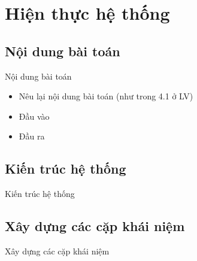 \section{Hiện thực hệ thống}
\subsection{Nội dung bài toán}
\begin{frame}{Nội dung bài toán}
\putlogo
\begin{itemize}
\item Nêu lại nội dung bài toán (như trong 4.1 ở LV)
\item Đầu vào
\item Đầu ra
\end{itemize}
\end{frame}

\subsection{Kiến trúc hệ thống}
\begin{frame}{Kiến trúc hệ thống}
\putlogo
\end{frame}

\subsection{Xây dựng các cặp khái niệm}
\begin{frame}{Xây dựng các cặp khái niệm}
\putlogo
\end{frame}
